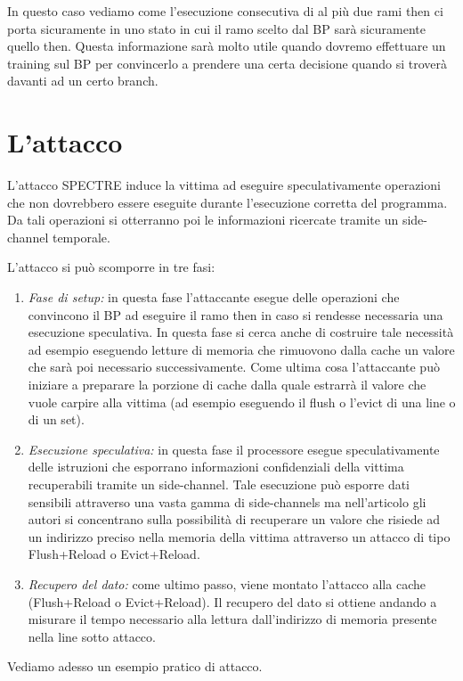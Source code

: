 			In questo caso vediamo come l'esecuzione consecutiva di al più due rami then ci porta sicuramente in uno stato in cui il ramo scelto dal \ac{BP} sarà sicuramente quello then. Questa informazione sarà molto utile quando dovremo effettuare un training sul \ac{BP} per convincerlo a prendere una certa decisione quando si troverà davanti ad un certo branch.
			
	\section{L'attacco}
		L'attacco SPECTRE induce la vittima ad eseguire speculativamente operazioni che non dovrebbero essere eseguite durante l'esecuzione corretta del programma. Da tali operazioni si otterranno poi le informazioni ricercate tramite un side-channel temporale.
		
		L'attacco si può scomporre in tre fasi:
		
		\begin{enumerate}
			\item \emph{Fase di setup:} in questa fase l'attaccante esegue delle operazioni che convincono il \ac{BP} ad eseguire il ramo then in caso si rendesse necessaria una esecuzione speculativa. In questa fase si cerca anche di costruire tale necessità ad esempio eseguendo letture di memoria che rimuovono dalla cache un valore che sarà poi necessario successivamente. Come ultima cosa l'attaccante può iniziare a preparare la porzione di cache dalla quale estrarrà il valore che vuole carpire alla vittima (ad esempio eseguendo il flush o l'evict di una line o di un set).
			\item \emph{Esecuzione speculativa:} in questa fase il processore esegue speculativamente delle istruzioni che esporrano informazioni confidenziali della vittima recuperabili tramite un side-channel. Tale esecuzione può esporre dati sensibili attraverso una vasta gamma di side-channels ma nell'articolo gli autori si concentrano sulla possibilità di recuperare un valore che risiede ad un indirizzo preciso nella memoria della vittima attraverso un attacco di tipo Flush+Reload o Evict+Reload.
			\item \emph{Recupero del dato:} come ultimo passo, viene montato l'attacco alla cache (Flush+Reload o Evict+Reload). Il recupero del dato si ottiene andando a misurare il tempo necessario alla lettura dall'indirizzo di memoria presente nella line sotto attacco.
		\end{enumerate}
	
		Vediamo adesso un esempio pratico di attacco.
		
